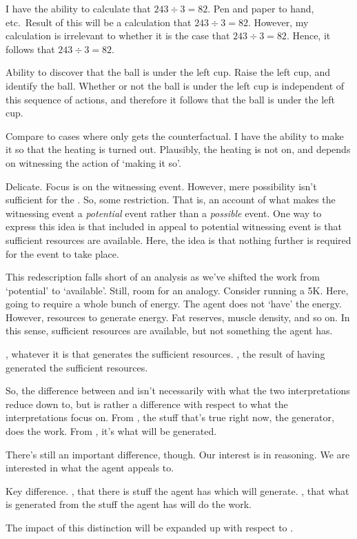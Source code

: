 \begin{note}[\WR{} def.]
  \begin{illustration}
    I have the ability to calculate that \(243 \div 3 = 82\).
    Pen and paper to hand, etc.\
    Result of this will be a calculation that \(243 \div 3 = 82\).
    However, my calculation is irrelevant to whether it is the case that \(243 \div 3 = 82\).
    Hence, it follows that \(243 \div 3 = 82\).
  \end{illustration}

  \begin{illustration}
    Ability to discover that the ball is under the left cup.
    Raise the left cup, and identify the ball.
    Whether or not the ball is under the left cup is independent of this sequence of actions, and therefore it follows that the ball is under the left cup.
  \end{illustration}

  Compare to cases where only gets the counterfactual.
  I have the ability to make it so that the heating is turned out.
  Plausibly, the heating is not on, and depends on witnessing the action of `making it so'.
\end{note}

\begin{note}
  Delicate.
  Focus is on the witnessing event.
  However, mere possibility isn't sufficient for the \aben{}.
  So, some restriction.
  That is, an account of what makes the witnessing event a \emph{potential} event rather than a \emph{possible} event.
  One way to express this idea is that included in appeal to potential witnessing event is that sufficient resources are available.
  Here, the idea is that nothing further is required for the event to take place.

  This redescription falls short of an analysis as we've shifted the work from `potential' to `available'.
  Still, room for an analogy.
  Consider running a 5K.
  Here, going to require a whole bunch of energy.
  The agent does not `have' the energy.
  However, resources to generate energy.
  Fat reserves, muscle density, and so on.
  In this sense, sufficient resources are available, but not something the agent has.

  \AR{}, whatever it is that generates the sufficient resources.
  \WR{}, the result of having generated the sufficient resources.

  So, the difference between \AR{} and \WR{} isn't necessarily with what the two interpretations reduce down to, but is rather a difference with respect to what the interpretations focus on.
  From \AR{}, the stuff that's true right now, the generator, does the work.
  From \WR{}, it's what will be generated.

  There's still an important difference, though.
  Our interest is in reasoning.
  We are interested in what the agent appeals to.

  Key difference.
  \AR{}, that there is stuff the agent has which will generate.
  \WR{}, that what is generated from the stuff the agent has will do the work.

  The impact of this distinction will be expanded up with respect to \gsi{}.
\end{note}


